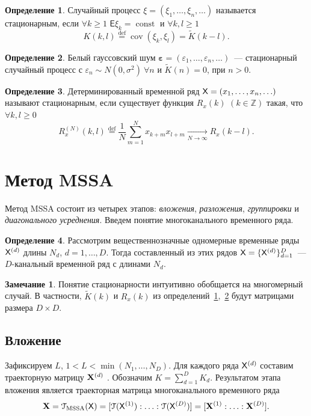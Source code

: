 \documentclass[specialist,
substylefile = spbu_report.rtx,
subf,href,colorlinks=true, 12pt]{disser}
\theoremstyle{definition}
\newtheorem{definition}{Определение}
\newtheorem{remark}{Замечание}
\begin{document}
\begin{definition}\label{def:stationaty_random}
	Случайный процесс $\xi=(\xi_1,\ldots, \xi_n,\ldots)$ называется стационарным, если $\forall k\geqslant1$ $\mathsf E\xi_k=\operatorname{const}$ и $\forall k,l\geqslant1$
	\[
	K(k, l)\overset{\text{def}}=\operatorname{cov}(\xi_k, \xi_l)= \widetilde{K}(k-l).
	\]
\end{definition}
\begin{definition}\label{def:stationaty_determ}
	Белый гауссовский шум $\boldsymbol{\varepsilon}=(\varepsilon_1,\ldots,\varepsilon_n,\ldots)$~--- стационарный случайный процесс с $\varepsilon_n\sim N(0, \sigma^2)~\forall n$ и $\widetilde K(n)=0$, при $n>0$.
\end{definition}
\begin{definition}
	Детерминированный временной ряд $\mathsf{X}=(x_1,\ldots,x_n,\ldots)$ называют стационарным, если существует функция $R_x(k)$ $(k\in\mathbb{Z})$ такая, что $\forall k,l\geqslant0$
	\begin{equation*}
		R_x^{(N)}(k,l)\overset{\text{def}}{=}\frac{1}{N}\sum_{m=1}^Nx_{k+m}x_{l+m}\underset{N\to\infty}\longrightarrow R_x(k - l).
	\end{equation*}
\end{definition}

\section{Метод MSSA}\label{sect:mssa}
Метод MSSA состоит из четырех этапов: \emph{вложения}, \emph{разложения}, \emph{группировки} и \emph{диагонального усреднения}. Введем понятие многоканального временного ряда.

\begin{definition}
	Рассмотрим вещественнозначные одномерные временные ряды $\mathsf{X}^{(d)}$ длины $N_d$, $d=1,\ldots,D$. Тогда составленный из этих рядов $\mathsf{X}=\{\mathsf{X}^{(d)}\}_{d=1}^D$~--- $D$-канальный временной ряд с длинами $N_d$.
\end{definition}
\begin{remark}
	Понятие стационарности интуитивно обобщается на многомерный случай. В частности, $\widetilde K(k)$ и $R_x(k)$ из определений~\ref{def:stationaty_random},~\ref{def:stationaty_determ} будут матрицами размера $D\times D$.
\end{remark}


\subsection{Вложение}\label{sect:embedding}
Зафиксируем $L$, $1<L<\min(N_1,\ldots,N_D)$. Для каждого ряда $\mathsf{X}^{(d)}$ составим траекторную матрицу $\mathbf{X}^{(d)}$ . Обозначим $K=\sum_{d=1}^D K_d$. Результатом этапа вложения является траекторная матрица многоканального временного ряда
\begin{equation}\label{eq:embedding_mssa}
	\mathbf{X}=\EuScript{T}_{\text{MSSA}}(\mathsf{X})=[\EuScript{T}(\mathsf{X}^{(1)}):\ldots:\EuScript{T}(\mathsf{X}^{(D)})]=[\mathbf{X}^{(1)}:\ldots:\mathbf{X}^{(D)}].
\end{equation}
\end{document}
